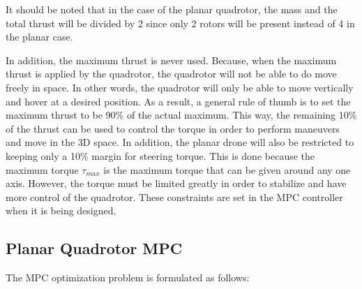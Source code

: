 \documentclass{thesisreport}
\begin{document}
It should be noted that in the case of the planar quadrotor, the mass and the total thrust will be divided by 2 since only 2 rotors will be present instead of 4 in the planar case.

In addition, the maximum thrust is never used. Because, when the maximum thrust is applied by the quadrotor, the quadrotor will not be able to do move freely in space. In other words, the quadrotor will only be able to move vertically and hover at a desired position. As a result, a general rule of thumb is to set the maximum thrust to be 90\% of the actual maximum. This way, the remaining 10\% of the thrust can be used to control the torque in order to perform maneuvers and move in the 3D space. In addition, the planar drone will also be restricted to keeping only a 10\% margin for steering torque. This is done because the maximum torque $\tau_{max}$ is the maximum torque that can be given around any one axis. However, the torque must be limited greatly in order to stabilize and have more control of the quadrotor. These constraints are set in the MPC controller when it is being designed.

\newpage

\subsection{Planar Quadrotor MPC}

The MPC optimization problem is formulated as follows:
\end{document}
